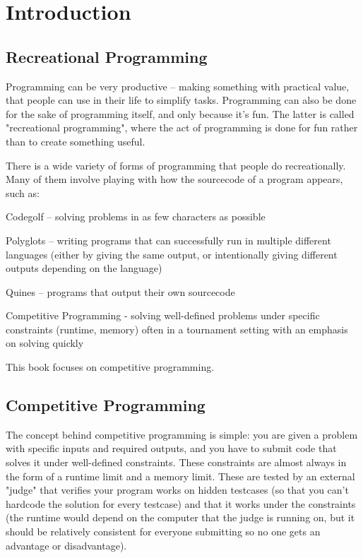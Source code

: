 \section{Introduction}
\subsection{Recreational Programming}

Programming can be very productive -- making something with practical value, that people can use in their life to simplify tasks. Programming can also be done for the sake of programming itself, and only because it's fun. The latter is called "recreational programming", where the act of programming is done for fun rather than to create something useful.

There is a wide variety of forms of programming that people do recreationally. Many of them involve playing with how the sourcecode of a program appears, such as:
\begin{enum}
\item Codegolf -- solving problems in as few characters as possible
\item Polyglots -- writing programs that can successfully run in multiple different languages (either by giving the same output, or intentionally giving different outputs depending on the language)
\item Quines -- programs that output their own sourcecode
\item Competitive Programming - solving well-defined problems under specific constraints (runtime, memory) often in a tournament setting with an emphasis on solving quickly
\end{enum}

This book focuses on competitive programming.

\subsection{Competitive Programming}

The concept behind competitive programming is simple: you are given a problem with specific inputs and required outputs, and you have to submit code that solves it under well-defined constraints. These constraints are almost always in the form of a runtime limit and a memory limit. These are tested by an external "judge" that verifies your program works on hidden testcases (so that you can't hardcode the solution for every testcase) and that it works under the constraints (the runtime would depend on the computer that the judge is running on, but it should be relatively consistent for everyone submitting so no one gets an advantage or disadvantage).



